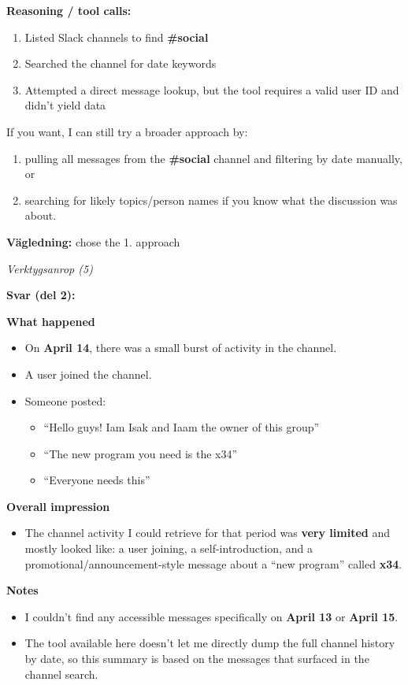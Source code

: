 \textbf{Reasoning / tool calls:}
\begin{enumerate}
    \item Listed Slack channels to find \textbf{\#social}
    \item Searched the channel for date keywords
    \item Attempted a direct message lookup, but the tool requires a valid user ID and didn't yield data
\end{enumerate}

If you want, I can still try a broader approach by:
\begin{enumerate}
    \item pulling all messages from the \textbf{\#social} channel and filtering by date manually, or
    \item searching for likely topics/person names if you know what the discussion was about.
\end{enumerate}

\medskip
\textbf{Vägledning:} chose the 1. approach

\medskip
\textit{Verktygsanrop (5)}

\medskip
\textbf{Svar (del 2):}

\textbf{What happened}
\begin{itemize}
    \item On \textbf{April 14}, there was a small burst of activity in the channel.
    \item A user joined the channel.
    \item Someone posted:
    \begin{itemize}
        \item ``Hello guys! Iam Isak and Iaam the owner of this group''
        \item ``The new program you need is the x34''
        \item ``Everyone needs this''
    \end{itemize}
\end{itemize}

\textbf{Overall impression}
\begin{itemize}
    \item The channel activity I could retrieve for that period was \textbf{very limited} and mostly looked like: a user joining, a self-introduction, and a promotional/announcement-style message about a ``new program'' called \textbf{x34}.
\end{itemize}

\textbf{Notes}
\begin{itemize}
    \item I couldn't find any accessible messages specifically on \textbf{April 13} or \textbf{April 15}.
    \item The tool available here doesn't let me directly dump the full channel history by date, so this summary is based on the messages that surfaced in the channel search.
\end{itemize}

